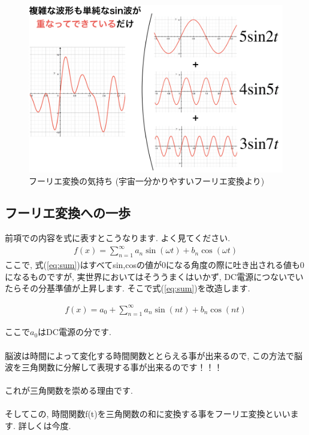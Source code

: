\documentclass[11pt,a4paper]{jreport}
\begin{document}
\begin{figure}[H]
\label{im:furier}
  \centering
  \includegraphics[width=120mm,bb=0 0 974 643]{figures/furier.png}
  \caption{フーリエ変換の気持ち (宇宙一分かりやすいフーリエ変換より)}
\end{figure}

\subsection{フーリエ変換への一歩}
前項での内容を式に表すとこうなります. よく見てください.
\begin{eqnarray}
f(x) = \sum_{n=1}^\infty {a_n \sin(\omega t) + b_n\cos(\omega t)}
\label{eq:sum}
\end{eqnarray}
ここで, 式(\ref{eq:sum})はすべてsin,cosの値が0になる角度の際に吐き出される値も0になるものですが, 実世界においてはそううまくはいかず, DC電源につないでいたらその分基準値が上昇します. そこで式(\ref{eq:sum})を改造します.

\begin{eqnarray}
f(x) = a_0 + \sum_{n=1}^\infty {a_n \sin(nt) + b_n\cos(nt)}
\label{eq:fixed_sum}
\end{eqnarray}

ここで$a_0$はDC電源の分です.\\
\\
脳波は時間によって変化する時間関数ととらえる事が出来るので, この方法で脳波を三角関数に分解して表現する事が出来るのです！！！\\
\\
これが三角関数を崇める理由です.\\
\\
そしてこの, 時間関数f(t)を三角関数の和に変換する事をフーリエ変換といいます. 詳しくは今度.\\
\end{document}
